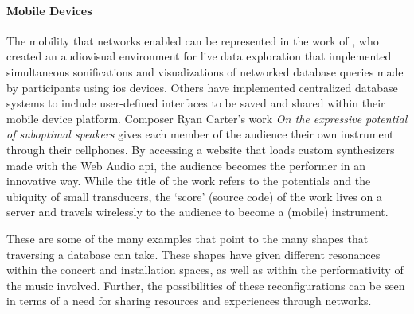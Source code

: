 {	\paragraph{Mobile Devices}
	The mobility that networks enabled can be represented in the work of 
	\cite{Liu:2013}, who created an audiovisual environment for live data exploration that implemented simultaneous sonifications and visualizations of networked database queries made by participants using \gls{ios} devices. Others have implemented centralized database systems \parencite{btaylor:2014} to include user-defined interfaces to be saved and shared within their mobile device platform. Composer Ryan Carter's work \textit{On the expressive potential of suboptimal speakers} \parencite{Rya17:OnT} gives each member of the audience their own instrument through their cellphones. By accessing a website that loads custom synthesizers made with the Web Audio \gls{api}, the audience becomes the performer in an innovative way. While the title of the work refers to the potentials and the ubiquity of small transducers, the `score' (source code) of the work lives on a server and travels wirelessly to the audience to become a (mobile) instrument.

	These are some of the many examples that point to the many shapes that traversing a database can take. These shapes have given different resonances within the concert and installation spaces, as well as within the performativity of the music involved. Further, the possibilities of these reconfigurations can be seen in terms of a need for sharing resources and experiences through networks.
}
